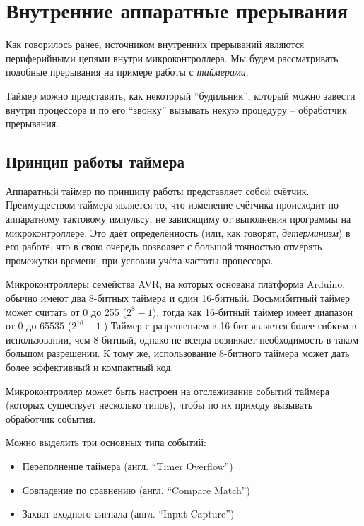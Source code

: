 \documentclass[../sparc.tex]{subfiles}
\begin{document}
\section{Внутренние аппаратные прерывания}

Как говорилось ранее, источником внутренних прерываний являются периферийными
цепями внутри микроконтроллера.  Мы будем рассматривать подобные прерывания на
примере работы с \emph{таймерами}.

Таймер можно представить, как некоторый ``будильник'', который можно завести
внутри процессора и по его ``звонку'' вызывать некую процедуру -- обработчик
прерывания.

\subsection{Принцип работы таймера}

Аппаратный таймер по принципу работы представляет собой счётчик.  Преимуществом
таймера является то, что изменение счётчика происходит по аппаратному тактовому
импульсу, не зависящиму от выполнения программы на микроконтроллере.  Это даёт
определённость (или, как говорят, \emph{детерминизм}) в его работе, что в свою
очередь позволяет с большой точностью отмерять промежутки времени, при условии
учёта частоты процессора.

Микроконтроллеры семейства AVR, на которых основана платформа Arduino, обычно
имеют два 8-битных таймера и один 16-битный.  Восьмибитный таймер может считать
от 0 до 255 ($2^{8}-1$), тогда как 16-битный таймер имеет диапазон от 0 до 65535
($2^{16}-1$.)  Таймер с разрешением в 16 бит является более гибким в
использовании, чем 8-битный, однако не всегда возникает необходимость в таком
большом разрешении.  К тому же, использование 8-битного таймера может дать более
эффективный и компактный код.\cite{avr:timers}

Микроконтроллер может быть настроен на отслеживание событий таймера (которых
существует несколько типов), чтобы по их приходу вызывать обработчик события.

Можно выделить три основных типа событий:
\begin{itemize}
\item Переполнение таймера (англ. ``Timer Overflow'')
\item Совпадение по сравнению (англ. ``Compare Match'')
\item Захват входного сигнала (англ. ``Input Capture'')
\end{itemize}
\end{document}

